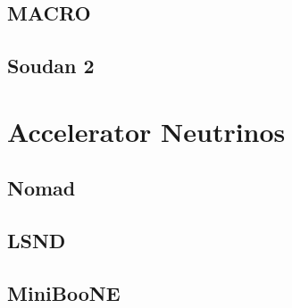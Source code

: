 \subsection{MACRO}

\subsection{Soudan 2}

\section{Accelerator Neutrinos}

\subsection{Nomad}

\subsection{LSND}

\subsection{MiniBooNE}
